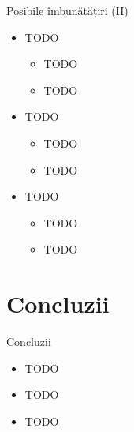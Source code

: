 \documentclass[9pt]{beamer}
\begin{document}
\begin{frame}{Posibile îmbunătățiri (II)}
\begin{itemize}
    \item \Large{TODO}
    \begin{itemize}
		\vskip5pt
		\item TODO
		\vskip5pt
		\item TODO
	\end{itemize}
	\vskip10pt
	\item \Large{TODO}
    \begin{itemize}
		\vskip5pt
		\item TODO
		\vskip5pt
		\item TODO
	\end{itemize}
	\item \Large{TODO}
    \begin{itemize}
		\vskip5pt
		\item TODO
		\vskip5pt
		\item TODO
	\end{itemize}
\end{itemize}
\end{frame}

\section[]{Concluzii}

\begin{frame}{Concluzii}
	\begin{itemize}
	    \item TODO
	    \vskip10pt
	    \item TODO
	    \vskip10pt
	    \item TODO
    \end{itemize}
\end{frame}
\end{document}
